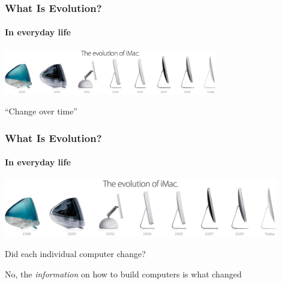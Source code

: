 \documentclass[10pt]{beamer}
\begin{document}
\begin{frame}[t]
\frametitle{What Is Evolution?}
\framesubtitle{In everyday life}

	\begin{center}
		\includegraphics[width=0.7\textwidth]{figures/imac.jpg}\\
	\end{center}

	\vspace{0.25cm}
		
	\begin{center}
		\textcolor{myblue}{``Change over time''}
	\end{center}
\end{frame}


\begin{frame}[t]
\frametitle{What Is Evolution?}
\framesubtitle{In everyday life}
\vspace{0.5cm}

	\begin{center}
		\includegraphics[width=0.9\textwidth]{figures/imac.jpg}
	\end{center}

\textcolor{myblue}{Did each individual computer change?	}

	\pause
	
	\vspace{0.5cm}
	
	No, the \emph{information} on how to build computers is what changed
\end{frame}
\end{document}
